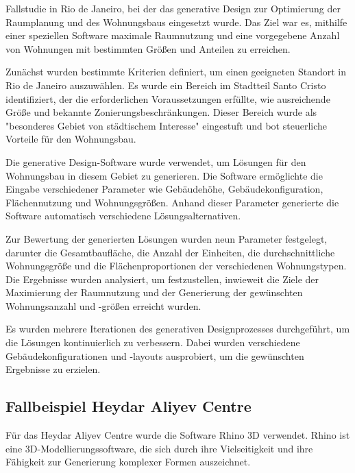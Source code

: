 Fallstudie in Rio de Janeiro, bei der das generative Design zur Optimierung der Raumplanung und des Wohnungsbaus eingesetzt wurde. Das Ziel war es, mithilfe einer speziellen Software maximale Raumnutzung und eine vorgegebene Anzahl von Wohnungen mit bestimmten Größen und Anteilen zu erreichen.

Zunächst wurden bestimmte Kriterien definiert, um einen geeigneten Standort in Rio de Janeiro auszuwählen. Es wurde ein Bereich im Stadtteil Santo Cristo identifiziert, der die erforderlichen Voraussetzungen erfüllte, wie ausreichende Größe und bekannte Zonierungsbeschränkungen. Dieser Bereich wurde als "besonderes Gebiet von städtischem Interesse" eingestuft und bot steuerliche Vorteile für den Wohnungsbau.

Die generative Design-Software wurde verwendet, um Lösungen für den Wohnungsbau in diesem Gebiet zu generieren. Die Software ermöglichte die Eingabe verschiedener Parameter wie Gebäudehöhe, Gebäudekonfiguration, Flächennutzung und Wohnungsgrößen. Anhand dieser Parameter generierte die Software automatisch verschiedene Lösungsalternativen.

Zur Bewertung der generierten Lösungen wurden neun Parameter festgelegt, darunter die Gesamtbaufläche, die Anzahl der Einheiten, die durchschnittliche Wohnungsgröße und die Flächenproportionen der verschiedenen Wohnungstypen. Die Ergebnisse wurden analysiert, um festzustellen, inwieweit die Ziele der Maximierung der Raumnutzung und der Generierung der gewünschten Wohnungsanzahl und -größen erreicht wurden.

Es wurden mehrere Iterationen des generativen Designprozesses durchgeführt, um die Lösungen kontinuierlich zu verbessern. Dabei wurden verschiedene Gebäudekonfigurationen und -layouts ausprobiert, um die gewünschten Ergebnisse zu erzielen. \autocite*{17}



\subsection*{Fallbeispiel Heydar Aliyev Centre}
Für das Heydar Aliyev Centre wurde die Software Rhino 3D verwendet. Rhino ist eine 3D-Modellierungssoftware, die sich durch ihre Vielseitigkeit und ihre Fähigkeit zur Generierung komplexer Formen auszeichnet.

